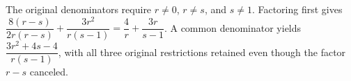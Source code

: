 The original denominators require $r\ne0$, $r\ne s$, and $s\ne1$. Factoring first gives $\dfrac{8(r-s)}{2r(r-s)}+\dfrac{3r^2}{r(s-1)}=\dfrac{4}{r}+\dfrac{3r}{s-1}$. A common denominator yields $\boxed{\dfrac{3r^2+4s-4}{r(s-1)}}$, with all three original restrictions retained even though the factor $r-s$ canceled.
